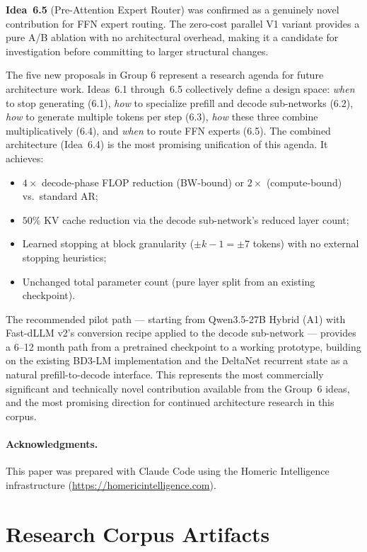 \documentclass[11pt]{article}
\begin{document}
\textbf{Idea~6.5} (Pre-Attention Expert Router) was confirmed as a genuinely novel contribution for FFN expert routing. The zero-cost parallel V1 variant provides a pure A/B ablation with no architectural overhead, making it a candidate for investigation before committing to larger structural changes.

The five new proposals in Group 6 represent a research agenda for future architecture work. Ideas~6.1 through~6.5 collectively define a design space: \emph{when} to stop generating (6.1), \emph{how} to specialize prefill and decode sub-networks (6.2), \emph{how} to generate multiple tokens per step (6.3), \emph{how} these three combine multiplicatively (6.4), and \emph{when} to route FFN experts (6.5). The combined architecture (Idea~6.4) is the most promising unification of this agenda. It achieves:
\begin{itemize}
    \item $4\times$ decode-phase FLOP reduction (BW-bound) or $2\times$ (compute-bound) vs.\ standard AR;
    \item $50\%$ KV cache reduction via the decode sub-network's reduced layer count;
    \item Learned stopping at block granularity ($\pm k-1 = \pm 7$ tokens) with no external stopping heuristics;
    \item Unchanged total parameter count (pure layer split from an existing checkpoint).
\end{itemize}
The recommended pilot path --- starting from Qwen3.5-27B Hybrid (A1) with Fast-dLLM v2's conversion recipe applied to the decode sub-network --- provides a 6--12 month path from a pretrained checkpoint to a working prototype, building on the existing BD3-LM implementation and the DeltaNet recurrent state as a natural prefill-to-decode interface. This represents the most commercially significant and technically novel contribution available from the Group~6 ideas, and the most promising direction for continued architecture research in this corpus.

\paragraph{Acknowledgments.} This paper was prepared with Claude Code using the Homeric Intelligence infrastructure (\url{https://homericintelligence.com}).

\appendix
\section{Research Corpus Artifacts}
\label{app:artifacts}
\end{document}

